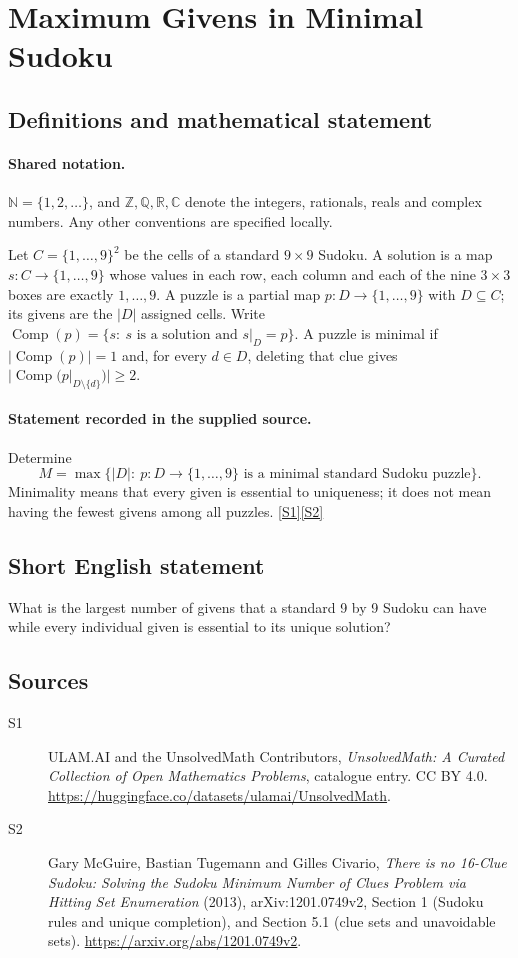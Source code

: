 \documentclass[11pt]{article}
\newcommand{\sref}[2]{\hyperlink{source:#1:#2}{[S#2]}}
\begin{document}
\section{Maximum Givens in Minimal Sudoku}\label{statement}

\subsection{Definitions and mathematical statement}

\paragraph{Shared notation.}$\mathbb N=\{1,2,\ldots\}$, and $\mathbb Z,\mathbb Q,\mathbb R,\mathbb C$ denote the integers, rationals, reals and complex numbers. Any other conventions are specified locally.


Let $C=\{1,\ldots,9\}^2$ be the cells of a standard $9\times9$ Sudoku. A solution is a map $s:C\to\{1,\ldots,9\}$ whose values in each row, each column and each of the nine $3\times3$ boxes are exactly $1,\ldots,9$. A puzzle is a partial map $p:D\to\{1,\ldots,9\}$ with $D\subseteq C$; its givens are the $|D|$ assigned cells. Write $\operatorname{Comp}(p)=\{s:\ s\text{ is a solution and }s|_D=p\}$. A puzzle is minimal if $|\operatorname{Comp}(p)|=1$ and, for every $d\in D$, deleting that clue gives $|\operatorname{Comp}(p|_{D\setminus\{d\}})|\ge2$.
\paragraph{Statement recorded in the supplied source.}
Determine
\[
 M=\max\bigl\{|D|:\ p:D\to\{1,\ldots,9\}\text{ is a minimal standard Sudoku puzzle}\bigr\}.
\]
Minimality means that every given is essential to uniqueness; it does not mean having the fewest givens among all puzzles. \sref{statement}{1}\sref{statement}{2}
\subsection{Short English statement}
What is the largest number of givens that a standard 9 by 9 Sudoku can have while every individual given is essential to its unique solution?
\subsection{Sources}
\begin{description}
\item[\hypertarget{source:statement:1}{S1}] ULAM.AI and the UnsolvedMath Contributors, \emph{UnsolvedMath: A Curated Collection of Open Mathematics Problems}, catalogue entry. CC BY 4.0. \url{https://huggingface.co/datasets/ulamai/UnsolvedMath}.
\item[\hypertarget{source:statement:2}{S2}] Gary McGuire, Bastian Tugemann and Gilles Civario, \emph{There is no 16-Clue Sudoku: Solving the Sudoku Minimum Number of Clues Problem via Hitting Set Enumeration} (2013), arXiv:1201.0749v2, Section 1 (Sudoku rules and unique completion), and Section 5.1 (clue sets and unavoidable sets). \url{https://arxiv.org/abs/1201.0749v2}.
\end{description}
\label{end:statement}
\end{document}
